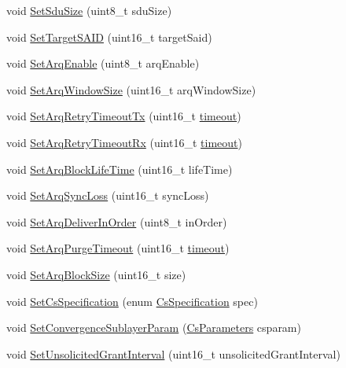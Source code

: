 \begin{DoxyCompactItemize}
void \hyperlink{classns3_1_1ServiceFlow_a88ff420147be9e386a22ef26b658804e}{Set\+Sdu\+Size} (uint8\+\_\+t sdu\+Size)
\item 
void \hyperlink{classns3_1_1ServiceFlow_a07a50813a3464608d84d684256f620da}{Set\+Target\+S\+A\+ID} (uint16\+\_\+t target\+Said)
\item 
void \hyperlink{classns3_1_1ServiceFlow_a2b46a76d3e458a786ebf5b699ff1ce27}{Set\+Arq\+Enable} (uint8\+\_\+t arq\+Enable)
\item 
void \hyperlink{classns3_1_1ServiceFlow_a7d5e08011a615b0b8c3cd957f0602262}{Set\+Arq\+Window\+Size} (uint16\+\_\+t arq\+Window\+Size)
\item 
void \hyperlink{classns3_1_1ServiceFlow_ab942b399f673b64878450407774ebce2}{Set\+Arq\+Retry\+Timeout\+Tx} (uint16\+\_\+t \hyperlink{openflow-switch_8cc_a386d174ae121d1cfa279074b7e209714}{timeout})
\item 
void \hyperlink{classns3_1_1ServiceFlow_ad0d6fb2c73312cc9a4c4ea0af7840628}{Set\+Arq\+Retry\+Timeout\+Rx} (uint16\+\_\+t \hyperlink{openflow-switch_8cc_a386d174ae121d1cfa279074b7e209714}{timeout})
\item 
void \hyperlink{classns3_1_1ServiceFlow_aaa197f9e42d65bc789eba987589bf7b1}{Set\+Arq\+Block\+Life\+Time} (uint16\+\_\+t life\+Time)
\item 
void \hyperlink{classns3_1_1ServiceFlow_a594330719d9832f04a7b7777ac8dda2c}{Set\+Arq\+Sync\+Loss} (uint16\+\_\+t sync\+Loss)
\item 
void \hyperlink{classns3_1_1ServiceFlow_ac7a757260eee63c7806356a06001f13b}{Set\+Arq\+Deliver\+In\+Order} (uint8\+\_\+t in\+Order)
\item 
void \hyperlink{classns3_1_1ServiceFlow_a8e0073fa0fdc0f8d87f3e555c998263d}{Set\+Arq\+Purge\+Timeout} (uint16\+\_\+t \hyperlink{openflow-switch_8cc_a386d174ae121d1cfa279074b7e209714}{timeout})
\item 
void \hyperlink{classns3_1_1ServiceFlow_a2b7a56af7a4a19924c55c3485932cec0}{Set\+Arq\+Block\+Size} (uint16\+\_\+t size)
\item 
void \hyperlink{classns3_1_1ServiceFlow_a72779cfbd71284ba06f10843ec0725b9}{Set\+Cs\+Specification} (enum \hyperlink{classns3_1_1ServiceFlow_ad87f7547b7c053db4472543e17d21952}{Cs\+Specification} spec)
\item 
void \hyperlink{classns3_1_1ServiceFlow_a81a801e05aac9e7d1cfad3304e1b9d97}{Set\+Convergence\+Sublayer\+Param} (\hyperlink{classns3_1_1CsParameters}{Cs\+Parameters} csparam)
\item 
void \hyperlink{classns3_1_1ServiceFlow_ac24ac69794285436be39a2e4aef7b805}{Set\+Unsolicited\+Grant\+Interval} (uint16\+\_\+t unsolicited\+Grant\+Interval)

\end{DoxyCompactItemize}
